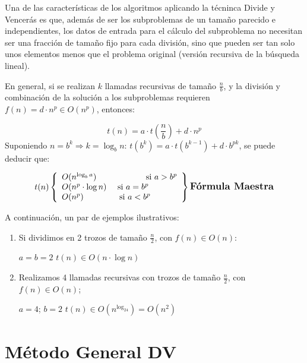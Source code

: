 \documentclass[10pt,a4paper,spanish]{report}
\theoremstyle{definition}
\theoremstyle{remark}
\begin{document}
Una de las características de los algoritmos aplicando la técninca Divide y Vencerás es que, además de ser los subproblemas de un tamaño parecido e independientes, los datos de entrada para el cálculo del subproblema no necesitan ser una fracción de tamaño fijo para cada división, sino que pueden ser tan solo unos elementos menos que el problema original (versión recursiva de la búsqueda lineal).

En general, si se realizan $k$ llamadas recursivas de tamaño $\frac{n}{b}$, y la división y combinación de la solución a los subproblemas requieren $f(n) = d\cdot n^p \in O(n^p)$, entonces:
\begin{center}
    \begin{displaymath}
        t(n) = a \cdot t\left(\frac{n}{b}\right) + d\cdot n^p   
    \end{displaymath}
    Suponiendo $n = b^k \Rightarrow k = \log_b n$: $t(b^k) = a\cdot t(b^{k-1}) + d\cdot b^{pk}$, se puede deducir que:

    \begin{displaymath}
        t(n) \left\{ \begin{array}{lll}
        O(n^{\log_b a}) \qquad \qquad \qquad \text{si } a > b^p \\
        O(n^p \cdot \log n) \quad \text{  si } a = b^p \\
        O(n^p) \qquad \qquad \text{ si } a < b^p 
        \end{array} \right\} \text{\large{\textbf{Fórmula Maestra}}}
    \end{displaymath}
\end{center}

A continuación, un par de ejemplos ilustrativos:
    \begin{enumerate}[$\spadesuit$]
        \item Si dividimos en 2 trozos de tamaño $\frac{n}{2}$, con $f(n) \in O(n)$:
        \begin{center}
            $a = b = 2$
            $t(n) \in O(n\cdot\log n)$
        \end{center}
        \item Realizamos 4 llamadas recursivas con trozos de tamaño $\frac{n}{2}$, con $f(n) \in O(n)$;
        \begin{center}
            $a = 4$; $b = 2$
            $t(n) \in O(n^{\log_24}) = O(n^2)$
        \end{center}
    \end{enumerate}

\section{\textcolor[rgb]{0.2,0.5,0.5}Método General DV}
\end{document}
